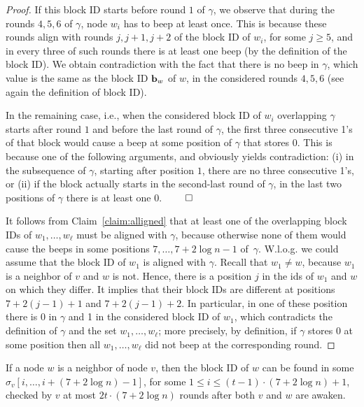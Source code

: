 \documentclass[11pt]{article}
\begin{document}
\begin{proof}
If this block ID starts before round $1$ of $\gamma$,
we observe that during the rounds $4,5,6$ of $\gamma$, node $w_i$ has to beep at least once. This is because these rounds align with rounds $j,j+1,j+2$ of the block ID of $w_i$, for some $j\ge 5$, and in every three of such rounds there is at least one beep (by the definition of the block ID).
We obtain contradiction with the fact that there is no beep in $\gamma$, which value is the same as the block ID ${\mathbf b}_w$ of $w$, in the considered rounds $4,5,6$ (see again the definition of block ID).

In the remaining case, i.e., when the considered block ID of $w_i$ overlapping $\gamma$ starts after round $1$ and before the last round of $\gamma$, the first three consecutive 1's of that block would cause a beep at some position of $\gamma$ that stores $0$. This is because one of the following arguments, and obviously yields contradiction: (i) in the subsequence of $\gamma$, starting after position $1$, there are no three consecutive 1's, or (ii) if the block actually starts in the second-last round of $\gamma$, in the last two positions of $\gamma$ there is at least one 0.
$\qed$

\smallskip
It follows from Claim~\ref{claim:alligned} that at least one of the overlapping block IDs of $w_1,\ldots,w_\ell$ must be aligned with $\gamma$,
because otherwise none of them would cause the beeps in some positions $7,\ldots,7+2\log n -1$ of~$\gamma$. 
W.l.o.g. we could assume that the block ID of $w_1$ is aligned with $\gamma$. Recall that $w_1\ne w$, because $w_1$ is a neighbor of $v$ and $w$ is not. Hence, there is a position $j$ in the ids of $w_1$ and $w$ on which they differ. It implies that their block IDs are different at positions $7+2(j-1) +1$ and $7+2(j-1)+2$. In particular, in one of these position there is 0 in $\gamma$ and 1 in the considered block ID of $w_1$, which contradicts the definition of $\gamma$ and the set $w_1,\ldots,w_\ell$; more precisely, by definition, if $\gamma$ stores 0 at some position then all  $w_1,\ldots,w_\ell$ did not beep at the corresponding round. 
\end{proof}





\begin{lemma}[Inclusion]
\label{lem:beeping-progress}
If a node $w$ is a neighbor of node $v$, 
then the block ID of $w$ can be found in some $\sigma_v[i, \ldots, i+(7+2\log n)-1]$, for some $1\le i\le (t-1)\cdot (7+2\log n)+1$, checked by $v$ at most $2t\cdot (7+2\log n)$ rounds after both $v$ and $w$ are awaken.
\end{lemma}
\end{document}
